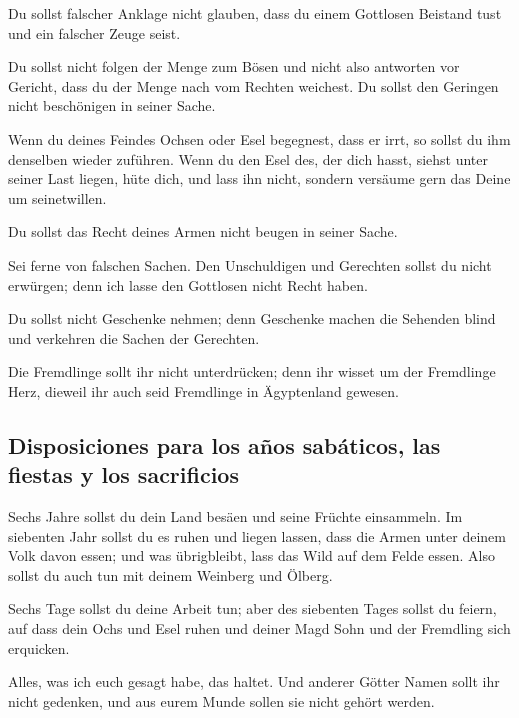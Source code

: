 Du sollst falscher Anklage nicht glauben, dass du einem
Gottlosen Beistand tust und ein falscher Zeuge seist.

 Du sollst nicht folgen der Menge zum Bösen und nicht also
antworten vor Gericht, dass du der Menge nach vom Rechten weichest.
 Du sollst den Geringen nicht beschönigen in seiner Sache.

 Wenn du deines Feindes Ochsen oder Esel begegnest, dass
er irrt, so sollst du ihm denselben wieder zuführen.  Wenn
du den Esel des, der dich hasst, siehst unter seiner Last liegen, hüte
dich, und lass ihn nicht, sondern versäume gern das Deine um
seinetwillen.

 Du sollst das Recht deines Armen nicht beugen in seiner
Sache.

 Sei ferne von falschen Sachen. Den Unschuldigen und
Gerechten sollst du nicht erwürgen; denn ich lasse den Gottlosen nicht
Recht haben.

 Du sollst nicht Geschenke nehmen; denn Geschenke machen
die Sehenden blind und verkehren die Sachen der Gerechten.

 Die Fremdlinge sollt ihr nicht unterdrücken; denn ihr
wisset um der Fremdlinge Herz, dieweil ihr auch seid Fremdlinge in
Ägyptenland gewesen.

\hypertarget{disposiciones-para-los-auxf1os-sabuxe1ticos-las-fiestas-y-los-sacrificios}{%
\subsection{Disposiciones para los años sabáticos, las fiestas y los
sacrificios}\label{disposiciones-para-los-auxf1os-sabuxe1ticos-las-fiestas-y-los-sacrificios}}

 Sechs Jahre sollst du dein Land besäen und seine Früchte
einsammeln.  Im siebenten Jahr sollst du es ruhen und
liegen lassen, dass die Armen unter deinem Volk davon essen; und was
übrigbleibt, lass das Wild auf dem Felde essen. Also sollst du auch tun
mit deinem Weinberg und Ölberg.

 Sechs Tage sollst du deine Arbeit tun; aber des
siebenten Tages sollst du feiern, auf dass dein Ochs und Esel ruhen und
deiner Magd Sohn und der Fremdling sich erquicken.

 Alles, was ich euch gesagt habe, das haltet. Und anderer
Götter Namen sollt ihr nicht gedenken, und aus eurem Munde sollen sie
nicht gehört werden.

